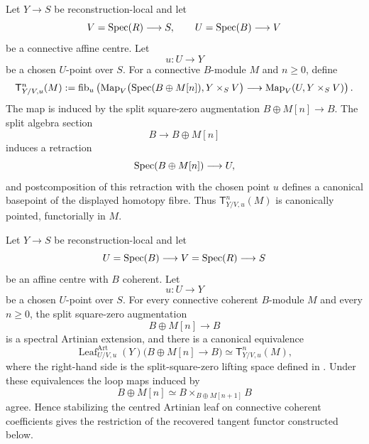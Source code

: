 \begin{definition}
\label{def:split-square-zero-tangent-levels}
Let \(Y\to S\) be reconstruction-local and let
\[
    V=\operatorname{Spec}(R)\longrightarrow S,
    \qquad
    U=\operatorname{Spec}(B)\longrightarrow V
\]
be a connective affine centre. Let
\[
    u:U\longrightarrow Y
\]
be a chosen \(U\)-point over \(S\). For a connective \(B\)-module \(M\) and
\(n\geq0\), define
\[
    \mathsf T^n_{Y/V,u}(M)
    :=
    \operatorname{fib}_u
    \left(
        \operatorname{Map}_V
        \bigl(\operatorname{Spec}(B\oplus M[n]),Y\times_SV\bigr)
        \longrightarrow
        \operatorname{Map}_V(U,Y\times_SV)
    \right).
\]
The map is induced by the split square-zero augmentation
\(B\oplus M[n]\to B\). The split algebra section
\[
    B\longrightarrow B\oplus M[n]
\]
induces a retraction
\[
    \operatorname{Spec}(B\oplus M[n])\longrightarrow U,
\]
and postcomposition of this retraction with the chosen point \(u\) defines a
canonical basepoint of the displayed homotopy fibre. Thus
\(\mathsf T^n_{Y/V,u}(M)\) is canonically pointed, functorially in \(M\).
\end{definition}

\begin{proposition}
\label{prop:artinian-leaf-tangent-levels}
Let \(Y\to S\) be reconstruction-local and let
\[
    U=\operatorname{Spec}(B)\longrightarrow V=\operatorname{Spec}(R)\longrightarrow S
\]
be an affine centre with \(B\) coherent. Let
\[
    u:U\longrightarrow Y
\]
be a chosen \(U\)-point over \(S\). For every connective coherent \(B\)-module
\(M\) and every \(n\geq0\), the split square-zero augmentation
\[
    B\oplus M[n]\longrightarrow B
\]
is a spectral Artinian extension, and there is a canonical equivalence
\[
    \operatorname{Leaf}^{\mathrm{Art}}_{U/V,u}(Y)
    \bigl(B\oplus M[n]\to B\bigr)
    \simeq
    \mathsf T^n_{Y/V,u}(M),
\]
where the right-hand side is the split-square-zero lifting space defined in
. Under these equivalences the
loop maps induced by
\[
    B\oplus M[n]
    \simeq
    B\times_{B\oplus M[n+1]}B
\]
agree. Hence stabilizing the centred Artinian leaf on connective coherent
coefficients gives the restriction of the recovered tangent functor
constructed below.
\end{proposition}

